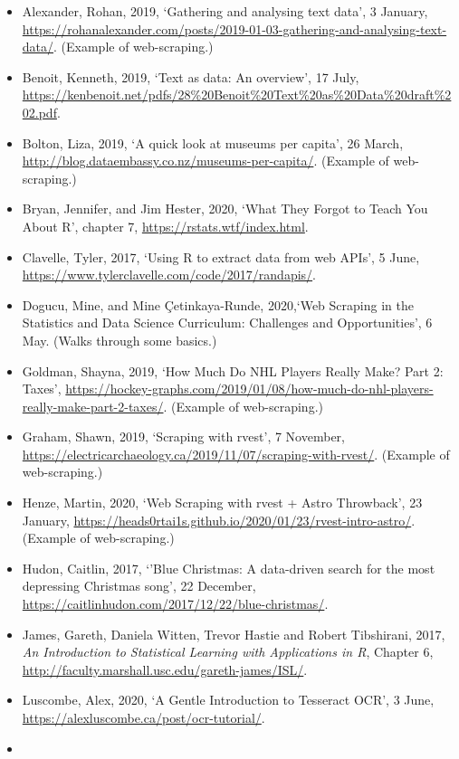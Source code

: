 \documentclass[
]{book}
\providecommand{\tightlist}{%
  \setlength{\itemsep}{0pt}\setlength{\parskip}{0pt}}
\begin{document}
\begin{itemize}
\tightlist
\item
  Alexander, Rohan, 2019, `Gathering and analysing text data', 3 January, \url{https://rohanalexander.com/posts/2019-01-03-gathering-and-analysing-text-data/}. (Example of web-scraping.)
\item
  Benoit, Kenneth, 2019, `Text as data: An overview', 17 July, \url{https://kenbenoit.net/pdfs/28\%20Benoit\%20Text\%20as\%20Data\%20draft\%202.pdf}.
\item
  Bolton, Liza, 2019, `A quick look at museums per capita', 26 March, \url{http://blog.dataembassy.co.nz/museums-per-capita/}. (Example of web-scraping.)
\item
  Bryan, Jennifer, and Jim Hester, 2020, `What They Forgot to Teach You About R', chapter 7, \url{https://rstats.wtf/index.html}.
\item
  Clavelle, Tyler, 2017, `Using R to extract data from web APIs', 5 June, \url{https://www.tylerclavelle.com/code/2017/randapis/}.
\item
  Dogucu, Mine, and Mine Çetinkaya-Runde, 2020,`Web Scraping in the Statistics and Data Science Curriculum: Challenges and Opportunities', 6 May. (Walks through some basics.)
\item
  Goldman, Shayna, 2019, `How Much Do NHL Players Really Make? Part 2: Taxes', \url{https://hockey-graphs.com/2019/01/08/how-much-do-nhl-players-really-make-part-2-taxes/}. (Example of web-scraping.)
\item
  Graham, Shawn, 2019, `Scraping with rvest', 7 November, \url{https://electricarchaeology.ca/2019/11/07/scraping-with-rvest/}. (Example of web-scraping.)
\item
  Henze, Martin, 2020, `Web Scraping with rvest + Astro Throwback', 23 January, \url{https://heads0rtai1s.github.io/2020/01/23/rvest-intro-astro/}. (Example of web-scraping.)
\item
  Hudon, Caitlin, 2017, `'Blue Christmas: A data-driven search for the most depressing Christmas song', 22 December, \url{https://caitlinhudon.com/2017/12/22/blue-christmas/}.
\item
  James, Gareth, Daniela Witten, Trevor Hastie and Robert Tibshirani, 2017, \emph{An Introduction to Statistical Learning with Applications in R}, Chapter 6, \url{http://faculty.marshall.usc.edu/gareth-james/ISL/}.
\item
  Luscombe, Alex, 2020, `A Gentle Introduction to Tesseract OCR', 3 June, \url{https://alexluscombe.ca/post/ocr-tutorial/}.
\item

\end{itemize}
\end{document}

